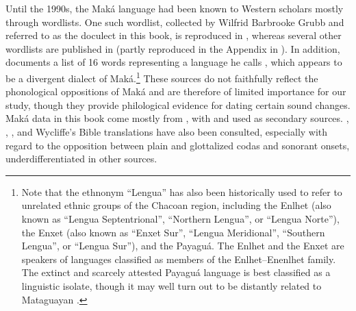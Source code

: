 \hspace*{-1.4pt}Until the 1990s, the Maká language had been known to Western scholars mostly through wordlists. One such wordlist, collected by Wilfrid Barbrooke Grubb and referred to as the  doculect in this book, is reproduced in \citet[238--256]{RJH15}, whereas several other wordlists \citep{VK31,JBe31,JBe34,MS37} are published in  (partly reproduced in the Appendix in ). In addition, \citet[456]{AD60} documents a list of 16 words representing a language he calls , which appears to be a divergent dialect of Maká.\footnote{Note that the ethnonym ``Lengua'' has also been historically used to refer to unrelated ethnic groups of the Chacoan region, including the Enlhet (also known as ``Lengua Septentrional'', ``Northern Lengua'', or ``Lengua Norte''), the Enxet (also known as ``Enxet Sur'', ``Lengua Meridional'', ``Southern Lengua'', or ``Lengua Sur''), and the Payaguá. The Enlhet and the Enxet are speakers of languages classified as members of the Enlhet–Enenlhet family. The extinct and scarcely attested Payaguá language is best classified as a linguistic isolate, though it may well turn out to be distantly related to Mataguayan \citep{PVB04}.} These sources do not faithfully reflect the phonological oppositions of Maká and are therefore of limited importance for our study, though they provide philological evidence for dating certain sound changes. Maká data in this book come mostly from \citet{AG89,AG94,AG99}, with \citet{CM15} and \citet{TT15} used as secondary sources. \citet{JB81}, \citet{maka-etnomat,PMA}, \citet{unuuneiki}, and Wycliffe’s Bible translations have also been consulted, especially with regard to the opposition between plain and glottalized codas and sonorant onsets, underdifferentiated in other sources.

